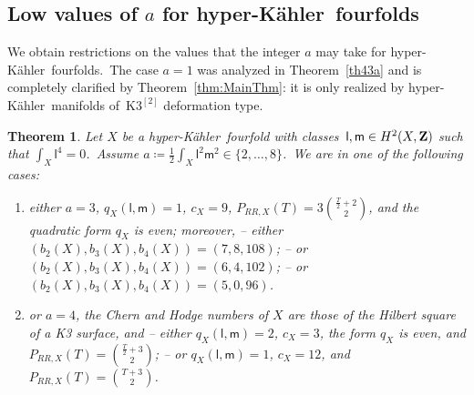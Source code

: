 \documentclass[12pt]{amsart}
\def\Z{{\bf Z}}
\def\hk{hyper-K\"ahler}
\newtheorem{theo}[lemm]{Theorem}
\theoremstyle{remark}
\def\lll{\ensuremath{\mathsf l}}
\def\mm{\ensuremath{\mathsf m}}
\begin{document}
\subsection{Low values of $a$ for \hk\ fourfolds}

We obtain restrictions on the values that the integer $a$ may take for \hk\ fourfolds.\ The case $a=1$ was analyzed in Theorem~\ref{th43a} and is completely clarified by Theorem~\ref{thm:MainThm}:   it is only realized by \hk\ manifolds of~$\mathrm{K3}^{[2]}$ deformation type.


\begin{theo}\label{th43}
Let $X$ be a  \hk\ fourfold with classes~$\lll,\mm\in H^2(X,\Z)$ such that \mbox{$\int_X \lll^4=0$}.\   Assume $a\coloneqq \frac{1}{2}\int_X \lll^{2}\mm^{2}\in \{2,\dots,8\}$.\
 We are in one of the following cases:
\begin{enumerate}[{\rm (a)}]
 \item\label{enum:th43a} either $a=3$,
 $q_X(\lll,\mm)=1$, $c_X=9$,     $P_{RR,X}(T)= 3\binom{\frac{T}2+2}{2}$, and the quadratic form $q_X$ is even; moreover,
\subitem-- either  $(b_2(X),b_3(X),b_4(X))=(7,8, 108)${\rm ;}
 \subitem-- or $(b_2(X),b_3(X),b_4(X))=(6,4, 102)${\rm ;}
\subitem-- or $(b_2(X),b_3(X),b_4(X))=(5,0, 96)$.
\item\label{enum:th43b} or $a=4$, the Chern and Hodge numbers of $X$ are those of the Hilbert square of a K3 surface, and
\subitem-- either $q_X(\lll,\mm)=2$, $c_X=3$, the form $q_X$ is even, and $P_{RR,X}(T)=\binom{\frac{T}2+3}{2}${\rm ;}
\subitem-- or $q_X(\lll,\mm)=1$, $c_X=12$, and $P_{RR,X}(T)=\binom{T+3}{2}$.
 \end{enumerate}
\end{theo}
\end{document}
